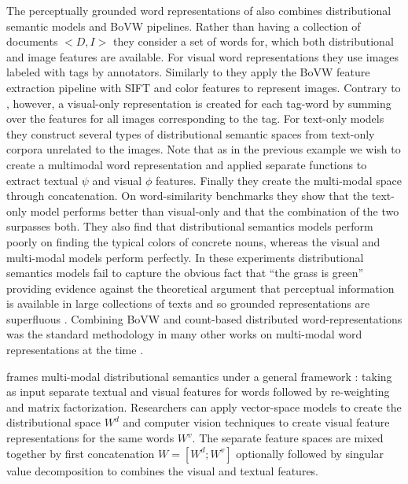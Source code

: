 The perceptually grounded word representations of \cite{bruni2012distributional}
also combines distributional semantic models and BoVW pipelines.
Rather than having a collection of documents $<D, I>$ they consider a set of words for, which
both distributional and image features are available. For visual word representations
they use images labeled with tags by annotators. Similarly to \cite{feng2010visual} they
apply the BoVW feature extraction pipeline with SIFT and color features to
represent images. Contrary to \cite{feng2010visual}, however,
a visual-only representation is created for each tag-word by summing over the features
for all images corresponding to the tag.
For text-only models they construct several types of distributional semantic spaces
from text-only corpora unrelated to the images.
Note that as in the previous example we wish to create a multimodal
word representation and applied separate functions to extract textual $\psi$ and visual
$\phi$ features. Finally they create the multi-modal space through concatenation.
On word-similarity benchmarks they show that the text-only model performs better than visual-only
and that the combination of the two surpasses both.
They also find that distributional semantics
models perform poorly on finding the typical colors of concrete nouns,
whereas the visual and multi-modal models perform perfectly. In these experiments
distributional semantics models fail to capture the obvious fact that ``the grass is green''
providing evidence against the theoretical argument that perceptual information is available in
large collections of texts and so grounded representations are superfluous \citep{louwerse2011symbol}.
Combining BoVW and count-based distributed word-representations was the standard methodology
in many other works on multi-modal word representations at the time
\citep{bruni2011distributional,leong2011going,leong2011measuring}.

\cite{bruni2014multimodal} frames multi-modal distributional semantics under a general framework
: taking as input separate textual and visual features for words followed by
re-weighting and matrix factorization. Researchers can apply vector-space
models to create the distributional space $W^d$ and computer vision techniques to create
visual feature representations for the same words $W^v$. The separate feature spaces
are mixed together by first concatenation $W = [W^d;W^v]$ optionally followed by singular value decomposition
to combines the visual and textual features.


